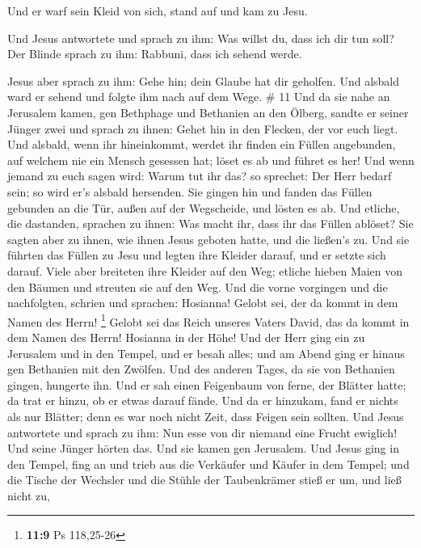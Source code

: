  Und er warf sein Kleid von sich, stand auf und kam zu
Jesu.

 Und Jesus antwortete und sprach zu ihm: Was willst du,
dass ich dir tun soll? Der Blinde sprach zu ihm: Rabbuni, dass ich
sehend werde.

 Jesus aber sprach zu ihm: Gehe hin; dein Glaube hat dir
geholfen. Und alsbald ward er sehend und folgte ihm nach auf dem Wege.
\# 11  Und da sie nahe an Jerusalem kamen, gen Bethphage
und Bethanien an den Ölberg, sandte er seiner Jünger zwei 
und sprach zu ihnen: Gehet hin in den Flecken, der vor euch liegt. Und
alsbald, wenn ihr hineinkommt, werdet ihr finden ein Füllen angebunden,
auf welchem nie ein Mensch gesessen hat; löset es ab und führet es her!
 Und wenn jemand zu euch sagen wird: Warum tut ihr das? so
sprechet: Der Herr bedarf sein; so wird er's alsbald hersenden.
 Sie gingen hin und fanden das Füllen gebunden an die Tür,
außen auf der Wegscheide, und lösten es ab.  Und etliche,
die dastanden, sprachen zu ihnen: Was macht ihr, dass ihr das Füllen
ablöset?  Sie sagten aber zu ihnen, wie ihnen Jesus
geboten hatte, und die ließen's zu.  Und sie führten das
Füllen zu Jesu und legten ihre Kleider darauf, und er setzte sich
darauf.  Viele aber breiteten ihre Kleider auf den Weg;
etliche hieben Maien von den Bäumen und streuten sie auf den Weg.
 Und die vorne vorgingen und die nachfolgten, schrien und
sprachen: Hosianna! Gelobt sei, der da kommt in dem Namen des Herrn!
\footnote{\textbf{11:9} Ps 118,25-26}  Gelobt sei das
Reich unseres Vaters David, das da kommt in dem Namen des Herrn!
Hosianna in der Höhe!  Und der Herr ging ein zu Jerusalem
und in den Tempel, und er besah alles; und am Abend ging er hinaus gen
Bethanien mit den Zwölfen.  Und des anderen Tages, da sie
von Bethanien gingen, hungerte ihn.  Und er sah einen
Feigenbaum von ferne, der Blätter hatte; da trat er hinzu, ob er etwas
darauf fände. Und da er hinzukam, fand er nichts als nur Blätter; denn
es war noch nicht Zeit, dass Feigen sein sollten.  Und
Jesus antwortete und sprach zu ihm: Nun esse von dir niemand eine Frucht
ewiglich! Und seine Jünger hörten das.  Und sie kamen gen
Jerusalem. Und Jesus ging in den Tempel, fing an und trieb aus die
Verkäufer und Käufer in dem Tempel; und die Tische der Wechsler und die
Stühle der Taubenkrämer stieß er um,  und ließ nicht zu,
